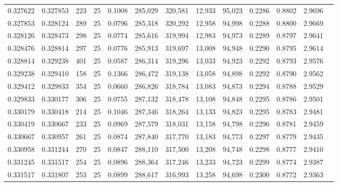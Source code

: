 \begin{tabular}{rrrrrrrrrrrrr}
0.327622 & 0.327853 &   223 &  25 &                                     0.1008 & 285,029 & 320,581 &  12,933 &  95,023 & 0.2286 & 0.8802 & 2.9696 \\
0.327853 & 0.328124 &   289 &  25 &                                     0.0796 & 285,318 & 320,292 &  12,958 &  94,998 & 0.2288 & 0.8800 & 2.9669 \\
0.328126 & 0.328473 &   298 &  25 &                                     0.0774 & 285,616 & 319,994 &  12,983 &  94,973 & 0.2289 & 0.8797 & 2.9641 \\
0.328476 & 0.328814 &   297 &  25 &                                     0.0776 & 285,913 & 319,697 &  13,008 &  94,948 & 0.2290 & 0.8795 & 2.9614 \\
0.328814 & 0.329238 &   401 &  25 &                                     0.0587 & 286,314 & 319,296 &  13,033 &  94,923 & 0.2292 & 0.8793 & 2.9576 \\
0.329238 & 0.329410 &   158 &  25 &                                     0.1366 & 286,472 & 319,138 &  13,058 &  94,898 & 0.2292 & 0.8790 & 2.9562 \\
0.329412 & 0.329833 &   354 &  25 &                                     0.0660 & 286,826 & 318,784 &  13,083 &  94,873 & 0.2294 & 0.8788 & 2.9529 \\
0.329833 & 0.330177 &   306 &  25 &                                     0.0755 & 287,132 & 318,478 &  13,108 &  94,848 & 0.2295 & 0.8786 & 2.9501 \\
0.330179 & 0.330418 &   214 &  25 &                                     0.1046 & 287,346 & 318,264 &  13,133 &  94,823 & 0.2295 & 0.8783 & 2.9481 \\
0.330419 & 0.330667 &   233 &  25 &                                     0.0969 & 287,579 & 318,031 &  13,158 &  94,798 & 0.2296 & 0.8781 & 2.9459 \\
0.330667 & 0.330957 &   261 &  25 &                                     0.0874 & 287,840 & 317,770 &  13,183 &  94,773 & 0.2297 & 0.8779 & 2.9435 \\
0.330958 & 0.331244 &   270 &  25 &                                     0.0847 & 288,110 & 317,500 &  13,208 &  94,748 & 0.2298 & 0.8777 & 2.9410 \\
0.331245 & 0.331517 &   254 &  25 &                                     0.0896 & 288,364 & 317,246 &  13,233 &  94,723 & 0.2299 & 0.8774 & 2.9387 \\
0.331517 & 0.331807 &   253 &  25 &                                     0.0899 & 288,617 & 316,993 &  13,258 &  94,698 & 0.2300 & 0.8772 & 2.9363 \\

\end{tabular}
